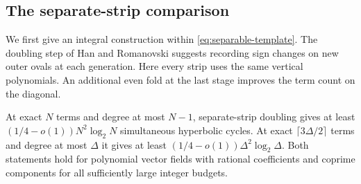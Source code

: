 \subsection{The separate-strip comparison}

We first give an integral construction within \eqref{eq:separable-template}. The doubling step of Han and Romanovski \cite[Definition~2.1 and Theorem~2.1]{HanRomanovski} suggests recording sign changes on new outer ovals at each generation. Here every strip uses the same vertical polynomials. An additional even fold at the last stage improves the term count on the diagonal.

\begin{proposition}\label{prop:strip-product}
At exact \(N\) terms and degree at most \(N-1\), separate-strip doubling gives at least \((1/4-o(1))N^2\log_2N\) simultaneous hyperbolic cycles. At exact \(\lceil3\Delta/2\rceil\) terms and degree at most \(\Delta\) it gives at least \((1/4-o(1))\Delta^2\log_2\Delta\). Both statements hold for polynomial vector fields with rational coefficients and coprime components for all sufficiently large integer budgets.
\end{proposition}

